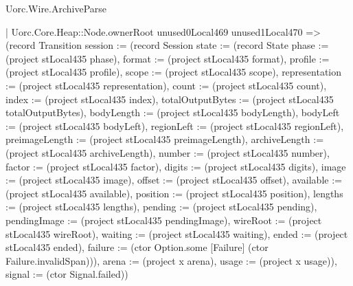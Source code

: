 \begin{lexlean}{Uorc.Wire.ArchiveParse}
\begin{semanticmodule}
{        | Uorc.Core.Heap::Node.ownerRoot unused0Local469 unused1Local470 => (record Transition {session := (record Session {state := (record State {phase := (project stLocal435 phase), format := (project stLocal435 format), profile := (project stLocal435 profile), scope := (project stLocal435 scope), representation := (project stLocal435 representation), count := (project stLocal435 count), index := (project stLocal435 index), totalOutputBytes := (project stLocal435 totalOutputBytes), bodyLength := (project stLocal435 bodyLength), bodyLeft := (project stLocal435 bodyLeft), regionLeft := (project stLocal435 regionLeft), preimageLength := (project stLocal435 preimageLength), archiveLength := (project stLocal435 archiveLength), number := (project stLocal435 number), factor := (project stLocal435 factor), digits := (project stLocal435 digits), image := (project stLocal435 image), offset := (project stLocal435 offset), available := (project stLocal435 available), position := (project stLocal435 position), lengths := (project stLocal435 lengths), pending := (project stLocal435 pending), pendingImage := (project stLocal435 pendingImage), wireRoot := (project stLocal435 wireRoot), waiting := (project stLocal435 waiting), ended := (project stLocal435 ended), failure := (ctor Option.some [Failure] (ctor Failure.invalidSpan))}), arena := (project x arena), usage := (project x usage)}), signal := (ctor Signal.failed)})
}
\end{semanticmodule}
\end{lexlean}
